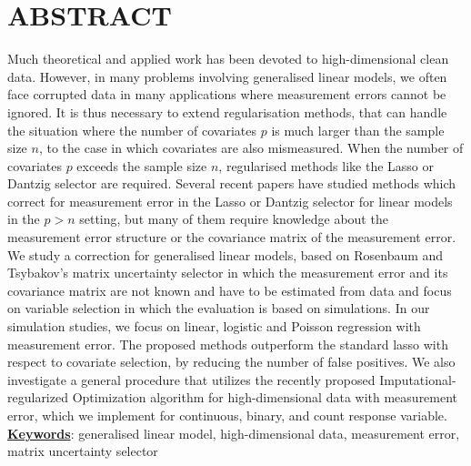 \documentclass[a4paper,12pt,openany]{report}
\theoremstyle{plain}
\theoremstyle{plain}
\theoremstyle{plain}
\theoremstyle{plain}
\theoremstyle{plain}
\theoremstyle{plain}
\theoremstyle{plain}
\theoremstyle{plain}
\theoremstyle{plain}
\theoremstyle{plain}
\theoremstyle{plain}
\theoremstyle{plain}
\begin{document}
\chapter*{ABSTRACT}
\noindent
Much theoretical and applied work has been devoted to high-dimensional clean data. However, in many problems involving generalised linear models, we often face corrupted data in many applications where measurement errors cannot be ignored. It is thus necessary to extend regularisation methods, that can handle the situation where the number of covariates $p$ is much larger than the sample size $n$, to the case in which covariates are also mismeasured. When the number of covariates $p$ exceeds the sample size $n$,
regularised methods like the Lasso or Dantzig selector are required. Several recent papers have studied methods which correct for measurement error in the Lasso or Dantzig selector for linear models in the $p > n$ setting, but many of them require knowledge about the measurement error structure or the covariance matrix of the measurement error. We study a correction for generalised
linear models, based on Rosenbaum and Tsybakov's matrix uncertainty selector in which the measurement error and its covariance matrix are not known and have to be estimated from data and focus on variable selection in which the evaluation is based on simulations. In our simulation studies, we focus on linear, logistic
and Poisson regression with measurement error. The proposed methods outperform the
standard lasso with respect to covariate selection, by reducing
the number of false positives. We also investigate a general procedure that utilizes the recently proposed Imputational-regularized Optimization algorithm for high-dimensional data with measurement error, which we implement for continuous, binary, and count response variable.\\
	\underline{\textbf{Keywords}}: generalised linear model, high-dimensional data, measurement error, matrix uncertainty selector
\end{document}

